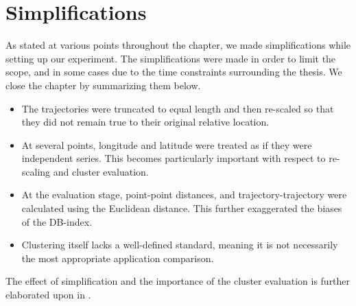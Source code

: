 \section{Simplifications}

As stated at various points throughout the chapter, we made simplifications while setting up our experiment. 
The simplifications were made in order to limit the scope, and in some cases due to the time constraints surrounding the thesis. 
We close the chapter by summarizing them below. 


\begin{itemize}

\item The trajectories were truncated to equal length and then re-scaled so that they did not remain true to their original relative location. 

\medskip
\item At several points, longitude and latitude were treated as if they were independent series. 
This becomes particularly important with respect to re-scaling and cluster evaluation.

\medskip
\item At the evaluation stage, point-point distances, and trajectory-trajectory were calculated using the Euclidean distance. 
This further exaggerated the biases of the DB-index. 

\medskip
\item Clustering itself lacks a well-defined standard, meaning it is not necessarily the most appropriate application comparison.
\medskip


\end{itemize}

The effect of simplification and the importance of the cluster evaluation is further elaborated upon in .





